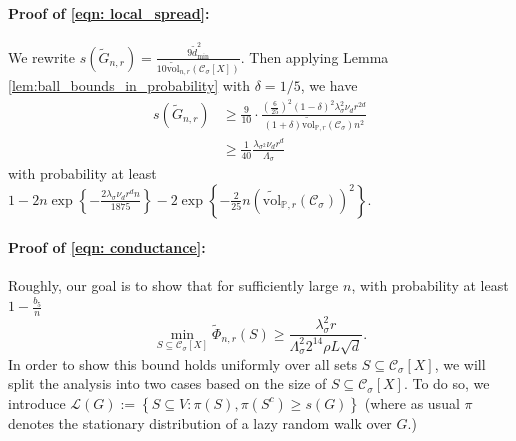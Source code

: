 \documentclass[11pt,twoside]{article}
\theoremstyle{definition}
\newcommand{\set}[1]{\left\{#1\right\}}
\newcommand{\vol}{\mathrm{vol}}
\newcommand{\1}{\mathbbm{1}}
\newcommand{\Xbf}{X}
\newcommand{\Pbb}{\mathbb{P}}
\newcommand{\Cset}{\mathcal{C}}
\newcommand{\Csig}{\Cset_{\sigma}}
\newcommand{\degminwt}{\widetilde{d}_{\min}}
\begin{document}
\paragraph{Proof of \eqref{eqn: local_spread}:}

We rewrite $s(\widetilde{G}_{n,r}) = \frac{9 \degminwt^2}{10\widetilde{\vol}_{n,r}(\Csig[\Xbf])}$. Then applying Lemma \ref{lem:ball_bounds_in_probability} with $\delta = 1/5$, we have
\begin{align*}
s(\widetilde{G}_{n,r}) & \geq \frac{9}{10} \cdot \frac{\left(\frac{6}{25}\right)^2 (1 - \delta)^2 \lambda_{\sigma}^2 \nu_d r^{2d}}{(1 + \delta)\widetilde{\vol}_{\Pbb,r}(\Csig)n^2} \\
& \geq \frac{1}{40} \frac{\lambda_{\sigma^2} \nu_d r^{d}}{\Lambda_{\sigma}}
\end{align*}
with probability at least $1 - 2n\exp\set{-\frac{2\lambda_{\sigma} \nu_d r^d n}{1875}} - 2\exp\set{-\frac{2}{25}n(\widetilde{\vol}_{\Pbb,r}(\Csig))^2}$. 

\paragraph{Proof of \eqref{eqn: conductance}:}

Roughly, our goal is to show that for sufficiently large $n$, with probability at least $1 - \frac{b_5}{n}$
\begin{equation*}
\min_{S \subseteq \Csig[\Xbf]} \widetilde{\Phi}_{n,r}(S) \geq \frac{\lambda_{\sigma}^2 r}{\Lambda_{\sigma}^2 2^{14} \rho L \sqrt{d}}.
\end{equation*}
In order to show this bound holds uniformly over all sets $S \subseteq \Csig[\Xbf]$, we will split the analysis into two cases based on the size of $S \subseteq \Csig[\Xbf]$. To do so, we introduce $\mathcal{L}(G) := \set{S \subseteq V: \pi(S), \pi(S^c) \geq s(G)}$ (where as usual $\pi$ denotes the stationary distribution of a lazy random walk over $G$.)
\end{document}
